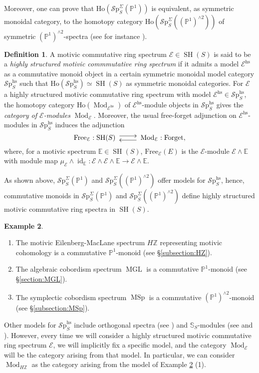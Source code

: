 \documentclass[10pt]{amsart}
\theoremstyle{definition}
\newtheorem{defn}{Definition}[section]
\newtheorem{exmp}[defn]{Example}
\theoremstyle{plain}
\numberwithin{equation}{section}
\newcommand{\0}{\emptyset}
\newcommand{\sE}{{\mathcal E}}
\newcommand{\E}{{\mathbb E}}
\renewcommand{\P}{{\mathbb P}}
\newcommand{\Z}{{\mathbb Z}}
\newcommand{\MGL}{{\operatorname{MGL}}}
\newcommand{\MSp}{{\operatorname{MSp}}}
\newcommand{\SH}{{\operatorname{SH}}}
\newcommand{\Mod}{{\operatorname{Mod}}}
\newcommand{\id}{{\operatorname{id}}}
\newcommand{\SPP}{{\mathcal{S}\text{p}}}
\newcommand{\hs}{{\operatorname{hs}}}
\begin{document}
Moreover, one can prove that $\text{Ho}(\SPP^\Sigma_S(\P^1))$ is equivalent, as symmetric monoidal category, to the homotopy category $\text{Ho}(\SPP^\Sigma_S((\P^1)^{\wedge 2}))$ of symmetric $(\P^1)^{\wedge 2}$-spectra (see for instance \cite[Theorem 3.2]{Panwal-cobordism}).

\begin{defn}
\label{defn:highlyStructuredRings}
    A motivic commutative ring spectrum $\sE \in \SH(S)$ is said to be a \emph{highly structured motivic commmutative ring spectrum} if it admits a model $\sE^{\hs}$ as a commutative monoid object in a certain symmetric monoidal model category $\SPP^{\hs}_S$ such that $\text{Ho}(\SPP^{\hs}_S) \simeq \SH(S)$ as symmetric monoidal categories. For $\sE$ a highly structured motivic commutative ring spectrum with model $\sE^{\hs}\in \SPP^\hs_S$, the homotopy category $\text{Ho}(\Mod_{\sE^{\hs}})$ of $\sE^{\hs}$-module objects in $\SPP^{\hs}_S$ gives the \emph{category of $\sE$-modules} $\Mod_\sE$. Moreover, the usual free-forget adjunction on $\sE^{\hs}$-modules in $\SPP^\hs_S$ induces the adjunction
\[
\text{Free}_\sE:\SH(S)\xymatrix{\ar@<3pt>[r]&\ar@<3pt>[l]}\Mod_\sE:\text{Forget},
\]
where, for a motivic spectrum $\E \in \SH(S)$, $\text{Free}_\sE(E)$ is the $\sE$-module $\sE \wedge \E$ with module map $\mu_\sE \wedge \id_\E:\sE \wedge \sE \wedge \E \to \sE \wedge \E$.
\end{defn}

As shown above, $\SPP_S^\Sigma(\P^1)$ and $\SPP^\Sigma_S((\P^1)^{\wedge 2})$ offer models for $\SPP^\hs_S$, hence, commutative monoids in  $\SPP_S^\Sigma(\P^1)$ and $\SPP^\Sigma_S((\P^1)^{\wedge 2})$ define highly structured motivic commutative ring spectra in $\SH(S)$. 
\begin{exmp}
\label{exmp:CommMonoids}
    \begin{enumerate}
        \item The motivic Eilenberg-MacLane spectrum $H\Z$ representing motivic cohomology is a commutative $\P^1$-monoid (see \S \ref{subsection:HZ}).
        \item The algebraic cobordism spectrum $\MGL$ is a commutative $\P^1$-monoid (see \S \ref{section:MGL}).
        \item The symplectic cobordism spectrum $\MSp$ is a commutative $(\P^1)^{\wedge 2}$-monoid (see \S \ref{subsection:MSp}).
    \end{enumerate}
\end{exmp}

Other models for $\SPP^\hs_S$ include orthogonal spectra (see \cite{OrthogonalSpectra}) and $\mathbb{S}_S$-modules (see \cite{EKMM:Modules} and \cite{Mandell:S-mod}). However, every time we will consider a highly structured motivic commutative ring spectrum $\sE$, we will implicitly fix a specific model, and the category $\Mod_\sE$ will be the category arising from that model. In particular, we can consider $\Mod_{H\Z}$ as the category arising from the model of Example \ref{exmp:CommMonoids} (1).   
\end{document}
